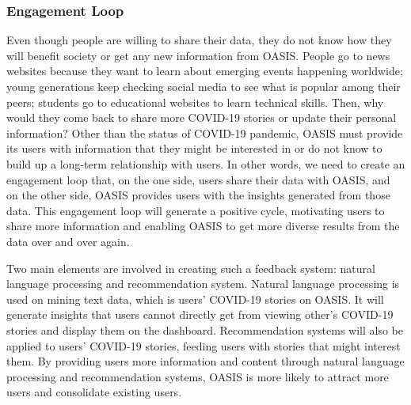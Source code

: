 \documentclass{ucsdreport}
\begin{document}
\subsubsection{Engagement Loop}
Even though people are willing to share their data, they do not know how they 
will benefit society or get any new information from OASIS. People go to news
websites because they want to learn about emerging events happening worldwide; 
young generations keep checking social media to see what is popular among their
peers; students go to educational websites to learn technical skills. Then, why 
would they come back to share more COVID-19 stories or update their personal
information? Other than the status of COVID-19 pandemic, OASIS must provide
its users with information that they might be interested in or do not know to
build up a long-term relationship with users.  In other words, we need to 
create an engagement loop that, on the one side, users share their data with 
OASIS, and on the other side, OASIS provides users with the insights generated
from those data. This engagement loop will generate a positive cycle, 
motivating users to share more information and enabling OASIS to get more 
diverse results from the data over and over again. 

Two main elements are involved in creating such a feedback system: natural
language processing and recommendation system. Natural language processing 
is used on mining text data, which is users’ COVID-19 stories on OASIS. It 
will generate insights that users cannot directly get from viewing other’s 
COVID-19 stories and display them on the dashboard. Recommendation systems 
will also be applied to users’ COVID-19 stories, feeding users with stories
that might interest them. By providing users more information and content 
through natural language processing and recommendation systems, OASIS is more
likely to attract more users and consolidate existing users. 
\end{document}
